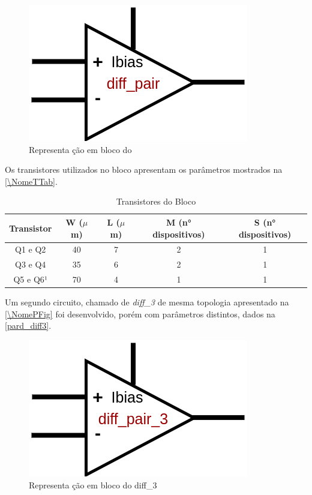 \begin{figure}[htb]
 \centering
    \centering
    \caption{Representa ção em bloco do \NomeBloco} \label{\NomeSFig}
    \includegraphics[scale=0.3]{Circuitos/diff_pair_block.png}
\end{figure}

Os transistores utilizados no bloco \NomeBloco{} apresentam os par\^ametros mostrados na \autoref{\NomeTTab}.

\begin{table}[htbp]
\caption{Transistores do Bloco \NomeBloco}
\label{\NomeTTab}
\centering
\begin{tabular}{ccccc}
\toprule
Transistor & W ($\mu$m)  & L ($\mu$m)           & M (n° dispositivos) & S (n° dispositivos)\\
\midrule \midrule
Q1 e Q2 & 40 & 7 & 2 & 1\\
\midrule
Q3 e Q4 & 35 & 6 & 2 & 1\\
\midrule
Q5 e Q6¹ & 70 & 4 & 1 & 1\\

\bottomrule
\end{tabular}
\end{table}

Um segundo circuito, chamado de \emph{diff\_3} de mesma topologia apresentado na \autoref{\NomePFig} foi desenvolvido, por\'em com par\^ametros distintos, dados na \autoref{pard_diff3}.

\begin{figure}[htb]
 \centering
    \centering
    \caption{Representa ção em bloco do diff\_3} \label{\NomeSFig}
    \includegraphics[scale=0.3]{Circuitos/diff_pair_3_block.png}
\end{figure}


